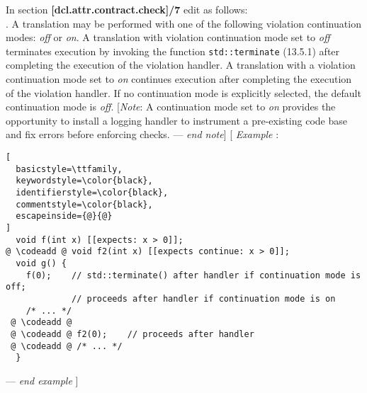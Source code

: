 In section \textbf{[dcl.attr.contract.check]/7} edit as follows:\\

.
A translation may be performed with one of the following violation 
continuation modes: \emph{off} or \emph{on}. 
A translation with violation continuation mode set to \emph{off} terminates 
execution by invoking the function \texttt{std::terminate} (13.5.1) after 
completing the execution of the violation handler. 
A translation with a violation continuation mode set to
\emph{on} continues execution after completing the execution of the violation
handler. 
If no continuation mode is explicitly selected, the default continuation mode is
\emph{off}. [\emph{Note}: A continuation mode set to \emph{on} provides the 
opportunity to install a logging handler to instrument a pre-existing
code base and fix errors before enforcing checks. --- \emph{end note}] 
[ \emph{Example} :
\newcommand{\codeadd}{\makebox[0pt][l]{\color{green}\rule[-4pt]{0.65\linewidth}{14pt}}}
\begin{lstlisting}[
  basicstyle=\ttfamily,
  keywordstyle=\color{black},
  identifierstyle=\color{black},
  commentstyle=\color{black},
  escapeinside={@}{@}
]
  void f(int x) [[expects: x > 0]];
@ \codeadd @ void f2(int x) [[expects continue: x > 0]];
  void g() {
    f(0);    // std::terminate() after handler if continuation mode is off;
             // proceeds after handler if continuation mode is on
    /* ... */
 @ \codeadd @
 @ \codeadd @ f2(0);    // proceeds after handler
 @ \codeadd @ /* ... */
  }
\end{lstlisting}
--- \emph{end example} ]
